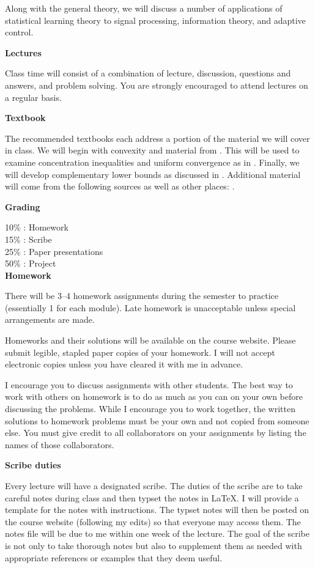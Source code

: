 \documentclass[10pt]{article}
\begin{document}
Along with the general theory, we will
discuss a number of applications of statistical learning theory to
signal processing, information theory, and adaptive control.

{\bf Lectures}

Class time will consist of a
combination of lecture, discussion, questions and answers, and problem
solving. You are strongly encouraged to attend lectures on a regular
basis. 

{\bf Textbook}

The recommended textbooks each address a portion of the material we
will cover in class. We will begin with convexity and material from
\citep{BoydVandenberghe2004}. This will be used to examine
concentration inequalities and uniform convergence as in
\citep{BoucheronLugosi2013}. Finally, we will develop complementary
lower bounds as discussed in \citep{Tsybakov2009}. 
Additional material will come from the following sources as well as
other places:
\citet{vanweak,DevroyeGyorfi2013,
  Vapnik1998,Geer2000}. 

\clearpage

{\bf Grading}

10\% : Homework\\
15\% : Scribe\\
25\% : Paper presentations\\
50\% : Project\\


{\bf Homework}

There will be 3--4 homework assignments during the semester to
  practice (essentially 1 for each module). Late homework is 
  unacceptable unless special arrangements are made. 

Homeworks and their solutions will be available on the course
  website. Please submit legible, stapled paper copies of your
  homework. I will not accept electronic copies unless you have
  cleared it with me in advance.

I encourage you to discuss
  assignments with other students.  The best way to work with others
  on homework is to do as much as you can on your own before
  discussing the problems. While I encourage you to work together, the
  written solutions to homework problems must be your own and not
  copied from someone else. You must give credit to all collaborators
  on your assignments by listing the names of those collaborators.

{\bf Scribe duties}

Every lecture will have a designated scribe. The duties of the scribe
are to take careful notes during class and then typset the notes in
\LaTeX. I will provide a template for the notes with instructions. The
typset notes will then be posted on the course website (following my
edits) so that everyone may access them. The notes file will be due to
me within one week of the lecture. The goal of the scribe is not only
to take thorough notes but also to supplement them as needed with
appropriate references or examples that they deem useful. 
\end{document}
